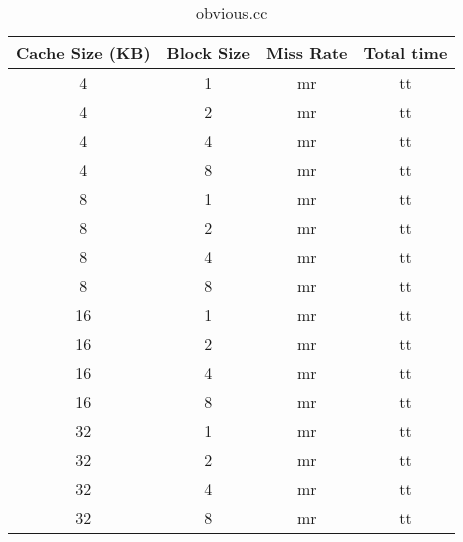 \documentclass[letterpaper, 12pt, oneside]{memoir}
\begin{document}
\begin{table}[H]
\centering
\begin{tabular}{c|c|c|c}
    Cache Size (KB)  & Block Size & Miss Rate & Total time \\ \hline 
    4  & 1 & mr & tt \\
    4  & 2 & mr & tt \\
    4  & 4 & mr & tt \\
    4  & 8 & mr & tt \\ \hline
    8  & 1 & mr & tt \\
    8  & 2 & mr & tt \\
    8  & 4 & mr & tt \\
    8  & 8 & mr & tt \\ \hline
    16 & 1 & mr & tt \\
    16 & 2 & mr & tt \\
    16 & 4 & mr & tt \\
    16 & 8 & mr & tt \\ \hline
    32 & 1 & mr & tt \\
    32 & 2 & mr & tt \\
    32 & 4 & mr & tt \\
    32 & 8 & mr & tt \\
\end{tabular}
\caption{obvious.cc}
\end{table}
\end{document}
